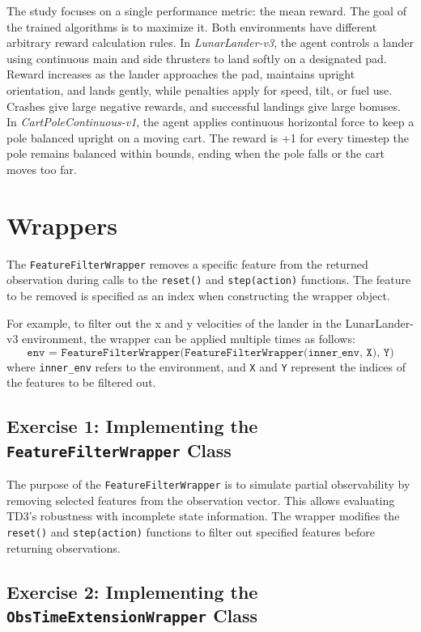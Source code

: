 \documentclass[12pt, a4paper]{article}
\begin{document}
The study focuses on a single performance metric: the mean reward. The goal of the trained algorithms is to maximize it. Both environments have different arbitrary reward calculation rules. In \textit{LunarLander-v3}, the agent controls a lander using continuous main and side thrusters to land softly on a designated pad. Reward increases as the lander approaches the pad, maintains upright orientation, and lands gently, while penalties apply for speed, tilt, or fuel use. Crashes give large negative rewards, and successful landings give large bonuses. In \textit{CartPoleContinuous-v1}, the agent applies continuous horizontal force to keep a pole balanced upright on a moving cart. The reward is +1 for every timestep the pole remains balanced within bounds, ending when the pole falls or the cart moves too far.


\section{Wrappers}

The \texttt{FeatureFilterWrapper} removes a specific feature from the returned observation during calls to the \texttt{reset()} and \texttt{step(action)} functions. The feature to be removed is specified as an index when constructing the wrapper object.

For example, to filter out the x and y velocities of the lander in the LunarLander-v3 environment, the wrapper can be applied multiple times as follows:
\[
\texttt{env = FeatureFilterWrapper(FeatureFilterWrapper(inner\_env, X), Y)}
\]
where \texttt{inner\_env} refers to the environment, and \texttt{X} and \texttt{Y} represent the indices of the features to be filtered out.

\subsection{Exercise 1: Implementing the \texttt{FeatureFilterWrapper} Class}

The purpose of the \texttt{FeatureFilterWrapper} is to simulate partial observability by removing selected features from the observation vector. This allows evaluating TD3’s robustness with incomplete state information. The wrapper modifies the \texttt{reset()} and \texttt{step(action)} functions to filter out specified features before returning observations. 

\subsection{Exercise 2: Implementing the \texttt{ObsTimeExtensionWrapper} Class}
\end{document}
